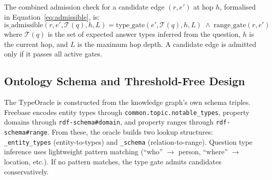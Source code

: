 The combined admission check for a candidate edge $(r, e')$ at hop $h$, formalised in Equation~\eqref{eq:admissible}, is:
\begin{equation}
  \text{is\_admissible}(r, e', \mathcal{T}(q), h, L) = \text{type\_gate}(e', \mathcal{T}(q), h, L) \;\land\; \text{range\_gate}(r, e')
  \label{eq:admissible}
\end{equation}
where $\mathcal{T}(q)$ is the set of expected answer types inferred from the question, $h$ is the current hop, and $L$ is the maximum hop depth. A candidate edge is admitted only if it passes all active gates.

\subsection{Ontology Schema and Threshold-Free Design}
\label{sec:ch3schema}

The TypeOracle is constructed from the knowledge graph's own schema triples. Freebase encodes entity types through \texttt{common.topic.notable\_types}, property domains through \texttt{rdf-schema\#domain}, and property ranges through \texttt{rdf-schema\#range}. From these, the oracle builds two lookup structures: \texttt{\_entity\_types} (entity-to-types) and \texttt{\_schema} (relation-to-range). Question type inference uses lightweight pattern matching (``who'' $\to$ person, ``where'' $\to$ location, etc.). If no pattern matches, the type gate admits candidates conservatively.

